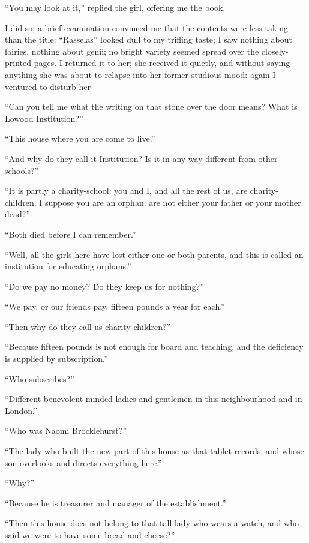 \enquote{You may look at it,} replied the girl, offering me the book.

I did so; a brief examination convinced me that the contents were less
taking than the title: \enquote{Rasselas} looked dull to my trifling
taste; I saw nothing about fairies, nothing about genii; no bright
variety seemed spread over the closely-printed pages. I returned it to
her; she received it quietly, and without saying anything she was about
to relapse into her former studious mood: again I ventured to disturb
her---

\enquote{Can you tell me what the writing on that stone over the door
means? What is Lowood Institution?}

\enquote{This house where you are come to live.}

\enquote{And why do they call it Institution? Is it in any way
different from other schools?}

\enquote{It is partly a charity-school: you and I, and all the rest of
us, are charity-children. I suppose you are an orphan: are not either
your father or your mother dead?}

\enquote{Both died before I can remember.}

\enquote{Well, all the girls here have lost either one or both parents,
and this is called an institution for educating orphans.}

\enquote{Do we pay no money? Do they keep us for nothing?}

\enquote{We pay, or our friends pay, fifteen pounds a year for each.}

\enquote{Then why do they call us charity-children?}

\enquote{Because fifteen pounds is not enough for board and teaching,
and the deficiency is supplied by subscription.}

\enquote{Who subscribes?}

\enquote{Different benevolent-minded ladies and gentlemen in this
neighbourhood and in London.}

\enquote{Who was Naomi Brocklehurst?}

\enquote{The lady who built the new part of this house as that tablet
records, and whose son overlooks and directs everything here.}

\enquote{Why?}

\enquote{Because he is treasurer and manager of the establishment.}

\enquote{Then this house does not belong to that tall lady who wears a
watch, and who said we were to have some bread and cheese?}

